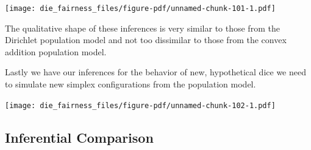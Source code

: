 \documentclass[
  letterpaper,
  DIV=11,
  numbers=noendperiod]{scrartcl}
\newenvironment{Shaded}{\begin{snugshade}}{\end{snugshade}}
\newcommand{\AttributeTok}[1]{\textcolor[rgb]{0.40,0.45,0.13}{#1}}
\newcommand{\ControlFlowTok}[1]{\textcolor[rgb]{0.00,0.23,0.31}{#1}}
\newcommand{\DecValTok}[1]{\textcolor[rgb]{0.68,0.00,0.00}{#1}}
\newcommand{\FloatTok}[1]{\textcolor[rgb]{0.68,0.00,0.00}{#1}}
\newcommand{\FunctionTok}[1]{\textcolor[rgb]{0.28,0.35,0.67}{#1}}
\newcommand{\NormalTok}[1]{\textcolor[rgb]{0.00,0.23,0.31}{#1}}
\newcommand{\OtherTok}[1]{\textcolor[rgb]{0.00,0.23,0.31}{#1}}
\newcommand{\SpecialCharTok}[1]{\textcolor[rgb]{0.37,0.37,0.37}{#1}}
\newcommand{\StringTok}[1]{\textcolor[rgb]{0.13,0.47,0.30}{#1}}
\begin{document}
\texttt{[image: die\_fairness\_files/figure-pdf/unnamed-chunk-101-1.pdf]}

The qualitative shape of these inferences is very similar to those from
the Dirichlet population model and not too dissimilar to those from the
convex addition population model.

Lastly we have our inferences for the behavior of new, hypothetical dice
we need to simulate new simplex configurations from the population
model.

\begin{Shaded}
\end{Shaded}

\texttt{[image: die\_fairness\_files/figure-pdf/unnamed-chunk-102-1.pdf]}

\subsection{Inferential Comparison}\label{inferential-comparison}
\end{document}

